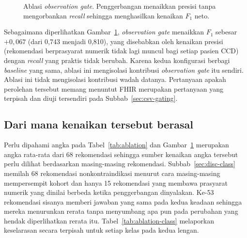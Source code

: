 \begin{figure}[htbp]
\centering
{}
\caption{Ablasi \emph{observation gate}. Penggerbangan menaikkan presisi tanpa mengorbankan
\emph{recall} sehingga menghasilkan kenaikan $F_1$ neto.}
\label{fig:ablation}
\end{figure}

Sebagaimana diperlihatkan Gambar~\ref{fig:ablation}, \emph{observation gate} menaikkan $F_1$
sebesar $+0{,}067$ (dari 0,743 menjadi 0,810), yang disebabkan oleh kenaikan
presisi (rekomendasi berprasyarat numerik tidak lagi muncul bagi setiap pasien CCD) dengan
\emph{recall} yang praktis tidak berubah. Karena kedua konfigurasi berbagi \emph{baseline}
yang sama, ablasi ini mengisolasi kontribusi \emph{observation gate} itu sendiri. Ablasi ini tidak mengisolasi kontribusi wadah datanya. Pertanyaan apakah perolehan tersebut memang
menuntut FHIR merupakan pertanyaan yang terpisah dan diuji tersendiri pada
Subbab~\ref{sec:csv-gating}.

\subsection{Dari mana kenaikan tersebut berasal}
\label{sec:ablation-class}
Perlu dipahami angka pada Tabel~\ref{tab:ablation} dan Gambar~\ref{fig:ablation} merupakan angka rata-rata dari 68 rekomendasi sehingga sumber kenaikan angka tersebut perlu dilihat berdasarkan masing-masing rekomendasi.
Subbab~\ref{sec:disc-class} memilah 68 rekomendasi nonkontraindikasi menurut cara
masing-masing mempersempit kohort dan hanya 15 rekomendasi yang membawa prasyarat numerik
yang dinilai berbeda ketika penggerbangan dinyalakan. Ke-53 rekomendasi sisanya memberi
jawaban yang sama pada kedua keadaan sehingga mereka menurunkan rerata tanpa menyumbang
apa pun pada perubahan yang hendak diperlihatkan rerata itu. Tabel~\ref{tab:ablation-class} melaporkan keselarasan secara terpisah untuk
setiap kelas pada kedua lengan.

